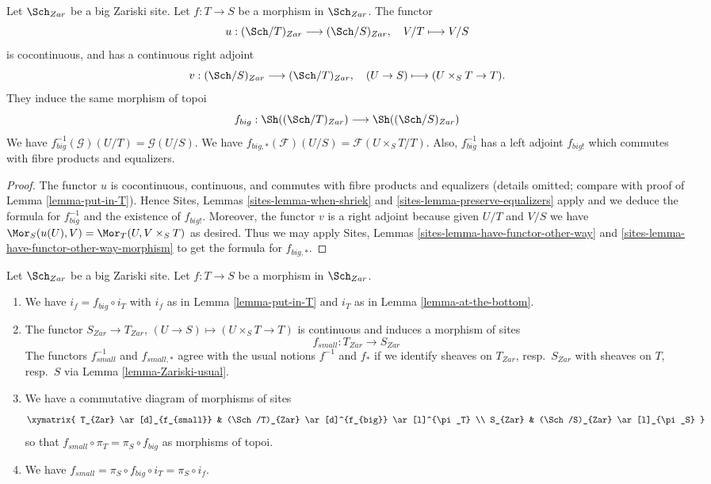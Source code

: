 \begin{lemma}
\label{lemma-morphism-big}
Let $\Sch_{Zar}$ be a big Zariski site.
Let $f : T \to S$ be a morphism in $\Sch_{Zar}$.
The functor
$$
u : (\Sch/T)_{Zar} \longrightarrow (\Sch/S)_{Zar},
\quad
V/T \longmapsto V/S
$$
is cocontinuous, and has a continuous right adjoint
$$
v : (\Sch/S)_{Zar} \longrightarrow (\Sch/T)_{Zar},
\quad
(U \to S) \longmapsto (U \times_S T \to T).
$$
They induce the same morphism of topoi
$$
f_{big} :
\Sh((\Sch/T)_{Zar})
\longrightarrow
\Sh((\Sch/S)_{Zar})
$$
We have $f_{big}^{-1}(\mathcal{G})(U/T) = \mathcal{G}(U/S)$.
We have $f_{big, *}(\mathcal{F})(U/S) = \mathcal{F}(U \times_S T/T)$.
Also, $f_{big}^{-1}$ has a left adjoint $f_{big!}$ which commutes with
fibre products and equalizers.
\end{lemma}

\begin{proof}
The functor $u$ is cocontinuous, continuous, and commutes with fibre products
and equalizers (details omitted; compare with proof of
Lemma \ref{lemma-put-in-T}).
Hence
Sites, Lemmas \ref{sites-lemma-when-shriek} and
\ref{sites-lemma-preserve-equalizers}
apply and we deduce the formula
for $f_{big}^{-1}$ and the existence of $f_{big!}$. Moreover,
the functor $v$ is a right adjoint because given $U/T$ and $V/S$
we have $\Mor_S(u(U), V) = \Mor_T(U, V \times_S T)$
as desired. Thus we may apply
Sites, Lemmas \ref{sites-lemma-have-functor-other-way} and
\ref{sites-lemma-have-functor-other-way-morphism}
to get the formula for $f_{big, *}$.
\end{proof}

\begin{lemma}
\label{lemma-morphism-big-small}
Let $\Sch_{Zar}$ be a big Zariski site.
Let $f : T \to S$ be a morphism in $\Sch_{Zar}$.
\begin{enumerate}
\item We have $i_f = f_{big} \circ i_T$ with $i_f$ as in
Lemma \ref{lemma-put-in-T} and $i_T$ as in
Lemma \ref{lemma-at-the-bottom}.
\item The functor $S_{Zar} \to T_{Zar}$,
$(U \to S) \mapsto (U \times_S T \to T)$ is continuous and induces
a morphism of sites
$$
f_{small} :
T_{Zar}
\longrightarrow
S_{Zar}
$$
The functors $f_{small}^{-1}$ and $f_{small, *}$ agree with
the usual notions $f^{-1}$ and $f_*$ if we identify sheaves
on $T_{Zar}$, resp.\ $S_{Zar}$ with sheaves on $T$, resp.\ $S$
via Lemma \ref{lemma-Zariski-usual}.
\item We have a commutative diagram of morphisms of sites
$$
\xymatrix{
T_{Zar} \ar[d]_{f_{small}} &
(\Sch/T)_{Zar} \ar[d]^{f_{big}} \ar[l]^{\pi_T} \\
S_{Zar} &
(\Sch/S)_{Zar} \ar[l]_{\pi_S}
}
$$
so that $f_{small} \circ \pi_T = \pi_S \circ f_{big}$ as morphisms of topoi.
\item We have $f_{small} = \pi_S \circ f_{big} \circ i_T = \pi_S \circ i_f$.
\end{enumerate}
\end{lemma}

